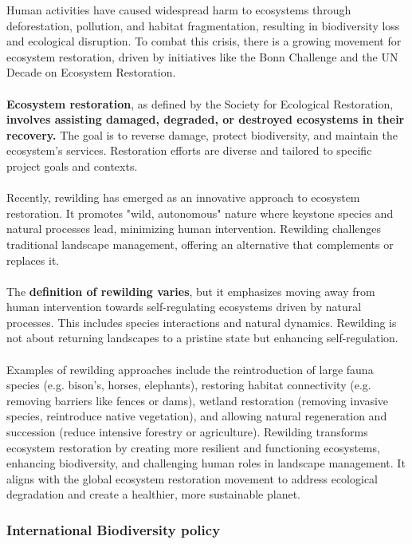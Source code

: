\documentclass[../summary.tex]{subfiles}
\begin{document}
Human activities have caused widespread harm to ecosystems through deforestation, pollution, and habitat fragmentation, resulting in biodiversity loss and ecological disruption. To combat this crisis, there is a growing movement for ecosystem restoration, driven by initiatives like the Bonn Challenge and the UN Decade on Ecosystem Restoration.\\
\\
\textbf{Ecosystem restoration}, as defined by the Society for Ecological Restoration, \textbf{involves assisting damaged, degraded, or destroyed ecosystems in their recovery.} The goal is to reverse damage, protect biodiversity, and maintain the ecosystem's services. Restoration efforts are diverse and tailored to specific project goals and contexts.\\
\\
Recently, rewilding has emerged as an innovative approach to ecosystem restoration. It promotes "wild, autonomous" nature where keystone species and natural processes lead, minimizing human intervention. Rewilding challenges traditional landscape management, offering an alternative that complements or replaces it.\\
\\
The \textbf{definition of rewilding varies}, but it emphasizes moving away from human intervention towards self-regulating ecosystems driven by natural processes. This includes species interactions and natural dynamics. Rewilding is not about returning landscapes to a pristine state but enhancing self-regulation.\\
\\
Examples of rewilding approaches include the reintroduction of large fauna species (e.g. bison's, horses, elephants), restoring habitat connectivity (e.g. removing barriers like fences or dams), wetland restoration (removing invasive species, reintroduce native vegetation), and allowing natural regeneration and succession (reduce intensive forestry or agriculture). Rewilding transforms ecosystem restoration by creating more resilient and functioning ecosystems, enhancing biodiversity, and challenging human roles in landscape management. It aligns with the global ecosystem restoration movement to address ecological degradation and create a healthier, more sustainable planet.
\newpage

\subsubsection{International Biodiversity policy}
\end{document}
